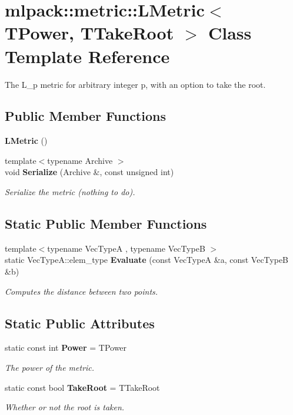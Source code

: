\section{mlpack\+:\+:metric\+:\+:L\+Metric$<$ T\+Power, T\+Take\+Root $>$ Class Template Reference}
\label{classmlpack_1_1metric_1_1LMetric}


The L\+\_\+p metric for arbitrary integer p, with an option to take the root.  


\subsection*{Public Member Functions}
\begin{DoxyCompactItemize}
\item 
{\bf L\+Metric} ()
\item 
{\footnotesize template$<$typename Archive $>$ }\\void {\bf Serialize} (Archive \&, const unsigned int)
\begin{DoxyCompactList}\small\item\em Serialize the metric (nothing to do). \end{DoxyCompactList}\end{DoxyCompactItemize}
\subsection*{Static Public Member Functions}
\begin{DoxyCompactItemize}
\item 
{\footnotesize template$<$typename Vec\+TypeA , typename Vec\+TypeB $>$ }\\static Vec\+Type\+A\+::elem\+\_\+type {\bf Evaluate} (const Vec\+TypeA \&a, const Vec\+TypeB \&b)
\begin{DoxyCompactList}\small\item\em Computes the distance between two points. \end{DoxyCompactList}\end{DoxyCompactItemize}
\subsection*{Static Public Attributes}
\begin{DoxyCompactItemize}
\item 
static const int {\bf Power} = T\+Power
\begin{DoxyCompactList}\small\item\em The power of the metric. \end{DoxyCompactList}\item 
static const bool {\bf Take\+Root} = T\+Take\+Root
\begin{DoxyCompactList}\small\item\em Whether or not the root is taken. \end{DoxyCompactList}\end{DoxyCompactItemize}


